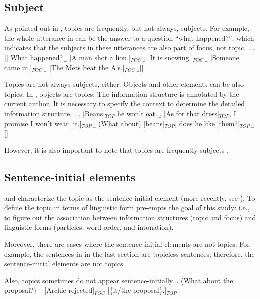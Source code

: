\subsection{Subject}

As pointed out in ,
topics are frequently, but not always, subjects.
For example, the whole utterance in \Next[a-d] can be the answer to a question ``what happened?'',
which indicates that the subjects in these utterances are also part of focus,
not topic.
%
\ex.
  \a.[] What happened?
  \b. [A man shot a lion.]$_{FOC}$
  \b. [It is snowing.]$_{FOC}$
  \b. [Someone came in.]$_{FOC}$
  \b. [The Mets beat the A's.]$_{FOC}$
  \b.[] \hfill{\cite[49, modified by NN]{gundel74}}


Topics are not always subjects, either.
Objects and other elements can be also topics.
In \Next,
objects are topics.
The information structure is annotated by the current author.
It is necessary to specify the context to determine the detailed information structure.
%
\ex.
 \a. [Beans]$_{TOP}$ he won't eat.
 \b. [As for that dress]$_{TOP}$, I promise I won't wear [it.]$_{TOP}$
 \b. (What about) [beans]$_{TOP}$, does he like [them?]$_{TOP}$
 \b.[] \hfill{\cite[27, modified by NN]{gundel74}}

However, it is also important to note that topics are frequently subjects \cite{li76}.


\subsection{Sentence-initial elements}

 and  characterize the topic as the sentence-initial element
(more recently, see ).
To define the topic in terms of linguistic form pre-empts the goal of this study:
i.e., to figure out the association between information structures (topic and focus) and linguistic forms (particles, word order, and intonation).

Moreover, there are cases where the sentence-initial elements are not topics.
For example, the sentences in \LLast in the last section are topicless sentences;
therefore, the sentence-initial elements are not topics.

Also, topics sometimes do not appear sentence-initially.
%
\ex. (What about the proposal?) -- [Archie rejected]$_{FOC}$ [\{it/the proposal\}.]$_{TOP}$

